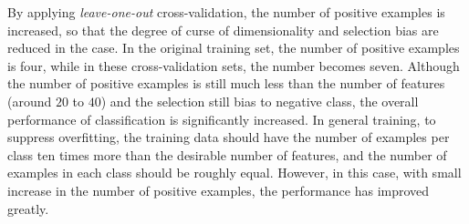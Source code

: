 
By applying \textit{leave-one-out} cross-validation, the number of positive examples is increased, so that the degree of curse of dimensionality and selection bias are reduced in the case. In the original training set, the number of positive examples is four, while in these cross-validation sets, the number becomes seven. Although the number of positive examples is still much less than the number of features (around $20$ to $40$) and the selection still bias to negative class, the overall performance of classification is significantly increased. In general training, to suppress overfitting, the training data should have the number of examples per class ten times more than the desirable number of features, and the number of examples in each class should be roughly equal. However, in this case, with small increase in the number of positive examples, the performance has improved greatly.

